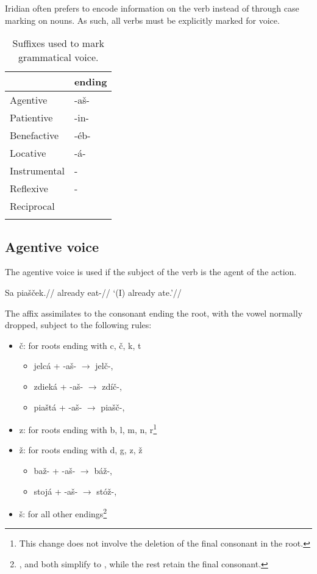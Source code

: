 Iridian often prefers to encode information on the verb instead of through case marking on nouns. As such, all verbs must be explicitly marked for voice.
\begin{table}[h!]
	\small \centering
	\caption{Suffixes used to mark grammatical voice.}
	\begin{tabu} to 0.8\textwidth{YM}
		\toprule
		&{\sc ending}\\
		\midrule
		Agentive	& -a\v{s}-\\ \addlinespace
		Patientive	& -in-\\ \addlinespace
		Benefactive	& -\'eb-\\ \addlinespace
		Locative	& -á-\\ \addlinespace
		Instrumental& -\\ \addlinespace
		Reflexive	& -\\ \addlinespace
		Reciprocal	& \\ \addlinespace
		\bottomrule
	\end{tabu}
\end{table}


\subsection{Agentive voice}
\par The agentive voice is used if the subject of the verb is the agent of the action.

\pex 
\begingl
\gla Sa pia\v{s}\v{c}ek.//
\glb already eat-//
\glft `(I) already ate.'//
\endgl
\xe

The affix  assimilates to the consonant ending the root, with the vowel  normally dropped, subject to the following rules:
\begin{itemize} 
	\item \v{c}: for roots ending with c, \v{c}, k, t
	\begin{itemize}
		\item jelc\'a + -a\v{s}- $\rightarrow$ jel\v{c}-, 
		\item zdiek\'a + -a\v{s}- $\rightarrow$ zd\'i\v{c}-, 
		\item pia\v{s}t\'a + -a\v{s}- $\rightarrow$ pia\v{s}\v{c}-, 
	\end{itemize}
	\item z: for roots ending with b, l, m, n, r\footnote{This change does not involve the deletion of the final consonant in the root.}
	\item \v{z}: for roots ending with d, g, z, \v{z}
	\begin{itemize}
		\item ba\v{z}- + -a\v{s}- $\rightarrow$ b\'a\v{z}-, 
		\item stoj\'a + -a\v{s}- $\rightarrow$ st\'o\v{z}-, 
	\end{itemize}
	\item \v{s}: for all other endings\footnote{ ,  and  both simplify to , while the rest retain the final consonant.}
\end{itemize}

